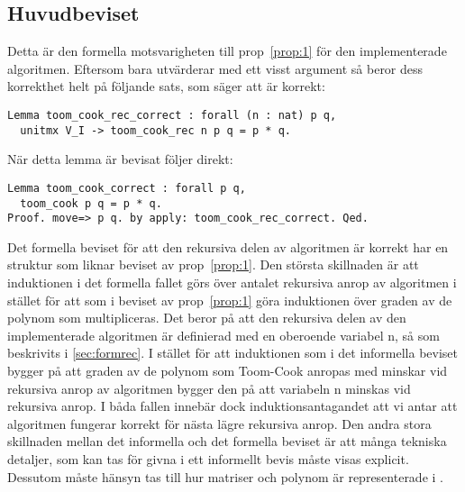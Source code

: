 \subsection{Huvudbeviset}
Detta är den formella motsvarigheten till prop~\ref{prop:1} för den
implementerade algoritmen. Eftersom  bara utvärderar
 med ett visst argument så beror dess korrekthet helt på
följande sats, som säger att  är korrekt:
\begin{lstlisting}
Lemma toom_cook_rec_correct : forall (n : nat) p q,
  unitmx V_I -> toom_cook_rec n p q = p * q.
\end{lstlisting}
När detta lemma är bevisat följer  direkt:
\begin{lstlisting}
Lemma toom_cook_correct : forall p q,
  toom_cook p q = p * q.
Proof. move=> p q. by apply: toom_cook_rec_correct. Qed.
\end{lstlisting}
Det formella beviset för att den rekursiva delen av algoritmen är korrekt har
en struktur som liknar beviset av prop~\ref{prop:1}.
Den största skillnaden är att induktionen i det formella fallet görs över antalet
rekursiva anrop av algoritmen i stället för att som i beviset av
prop~\ref{prop:1} göra induktionen över graden av de polynom som multipliceras. Det beror
på att den rekursiva delen av den implementerade algoritmen 
är definierad med en oberoende variabel n, så som beskrivits i
\ref{sec:formrec}. I stället för att induktionen som i det informella
beviset bygger på att graden av de polynom som Toom-Cook anropas med minskar
vid rekursiva anrop av algoritmen bygger den på att variabeln n minskas vid
rekursiva anrop. I båda fallen innebär dock induktionsantagandet att vi antar
att algoritmen fungerar korrekt för nästa lägre rekursiva anrop.
Den andra stora skillnaden mellan det informella och det formella beviset är
att många tekniska detaljer, som kan tas för givna i ett informellt bevis måste
visas explicit. Dessutom måste hänsyn tas till hur matriser och polynom är
representerade i \ssr{}.

